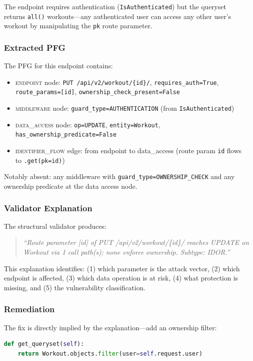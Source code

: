 The endpoint requires authentication (\texttt{IsAuthenticated}) but the queryset returns \texttt{all()} workouts—any authenticated user can access any other user's workout by manipulating the \texttt{pk} route parameter.

\subsubsection{Extracted PFG}

The PFG for this endpoint contains:
\begin{itemize}
    \item \textsc{endpoint} node: \texttt{PUT /api/v2/workout/\{id\}/}, \texttt{requires\_auth=True}, \texttt{route\_params=[id]}, \texttt{ownership\_check\_present=False}
    \item \textsc{middleware} node: \texttt{guard\_type=AUTHENTICATION} (from \texttt{IsAuthenticated})
    \item \textsc{data\_access} node: \texttt{op=UPDATE}, \texttt{entity=Workout}, \texttt{has\_ownership\_predicate=False}
    \item \textsc{identifier\_flow} edge: from endpoint to data\_access (route param \texttt{id} flows to \texttt{.get(pk=id)})
\end{itemize}

Notably absent: any middleware with \texttt{guard\_type=OWNERSHIP\_CHECK} and any ownership predicate at the data access node.

\subsubsection{Validator Explanation}

The structural validator produces:
\begin{quote}
\emph{``Route parameter [id] of PUT /api/v2/workout/\{id\}/ reaches UPDATE on Workout via 1 call path(s); none enforce ownership. Subtype: IDOR.''}
\end{quote}

This explanation identifies: (1) which parameter is the attack vector, (2) which endpoint is affected, (3) which data operation is at risk, (4) what protection is missing, and (5) the vulnerability classification.

\subsubsection{Remediation}

The fix is directly implied by the explanation—add an ownership filter:
\begin{lstlisting}[language=Python, basicstyle=\small\ttfamily, frame=single]
def get_queryset(self):
    return Workout.objects.filter(user=self.request.user)
\end{lstlisting}

